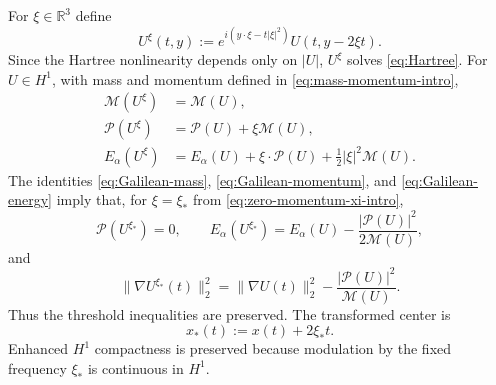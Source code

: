 \documentclass[preprint,12pt]{elsarticle}
\numberwithin{equation}{section}
\theoremstyle{remark}
\newcommand{\R}{\mathbb R}
\newcommand{\Ecal}{E_{\alpha}}
\newcommand{\Mcal}{\mathcal M}
\newcommand{\Pcal}{\mathcal P}
\begin{document}
For $\xi\in\R^3$ define
\begin{equation}\label{eq:Galilean-transform}
  U^\xi(t,y)
  :=e^{i(y\cdot\xi-t|\xi|^2)}U(t,y-2\xi t).
\end{equation}
Since the Hartree nonlinearity depends only on $|U|$, $U^\xi$ solves \eqref{eq:Hartree}. For $U\in H^1$, with mass and momentum defined in \eqref{eq:mass-momentum-intro},
\begin{align}
  \Mcal(U^\xi)&=\Mcal(U),\label{eq:Galilean-mass}\\
  \Pcal(U^\xi)&=\Pcal(U)+\xi\Mcal(U),\label{eq:Galilean-momentum}\\
  \Ecal(U^\xi)&=\Ecal(U)+\xi\cdot\Pcal(U)
  +\frac12|\xi|^2\Mcal(U).\label{eq:Galilean-energy}
\end{align}
The identities \eqref{eq:Galilean-mass}, \eqref{eq:Galilean-momentum}, and \eqref{eq:Galilean-energy} imply that, for $\xi=\xi_*$ from \eqref{eq:zero-momentum-xi-intro},
\begin{equation}\label{eq:Galilean-zero}
  \Pcal(U^{\xi_*})=0,
  \qquad
  \Ecal(U^{\xi_*})=\Ecal(U)-\frac{|\Pcal(U)|^2}{2\Mcal(U)},
\end{equation}
and
\begin{equation}\label{eq:Galilean-gradient}
  \|\nabla U^{\xi_*}(t)\|_2^2
  =\|\nabla U(t)\|_2^2-\frac{|\Pcal(U)|^2}{\Mcal(U)}.
\end{equation}
Thus the threshold inequalities are preserved. The transformed center is
\begin{equation}\label{eq:transformed-center}
  x_*(t):=x(t)+2\xi_*t.
\end{equation}
Enhanced $H^1$ compactness is preserved because modulation by the fixed frequency $\xi_*$ is continuous in $H^1$.
\end{document}
